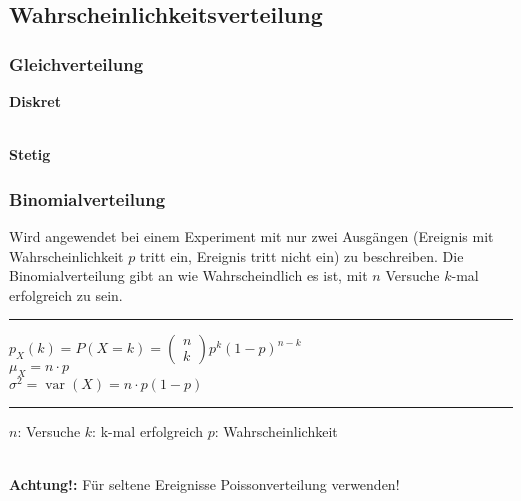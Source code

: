 \subsection{Wahrscheinlichkeitsverteilung}
\subsubsection{Gleichverteilung}
\begin{minipage}[t]{0.48\textwidth}
	\textbf{Diskret}\\
	\\[3pt]
	
\end{minipage} \hspace{0.04\textwidth}
\begin{minipage}[t]{0.3\textwidth}
	\textbf{Stetig}\\
\end{minipage}

\subsubsection{Binomialverteilung}
Wird angewendet bei einem Experiment mit nur zwei Ausgängen (Ereignis mit Wahrscheinlichkeit $p$ tritt ein, Ereignis tritt nicht ein) zu beschreiben. Die Binomialverteilung gibt an wie Wahrscheindlich es ist, mit $n$ Versuche $k$-mal erfolgreich zu sein. \\
\vrule \begin{minipage}{0.41\textwidth}
	\hrule
	\vspace{5pt}
	 $p_X(k)=P(X=k)=\left(\begin{array}{l}
	n \\
	k
	\end{array}\right) p^{k}(1-p)^{n-k}$\\
	$\mu_X=n \cdot p$\\
	$\sigma^{2}=\operatorname{var}(X)=n \cdot p(1-p)$
	\vspace{5pt}
	\hrule
\end{minipage}\vrule \hspace{0.04\textwidth}
\begin{minipage}{0.55\textwidth}
	$n$: Versuche \quad $k$: k-mal erfolgreich \quad $p$: Wahrscheinlichkeit
\end{minipage}\\[5pt]
\color{red} \textbf{Achtung!:} \color{black} Für seltene Ereignisse Poissonverteilung verwenden!

